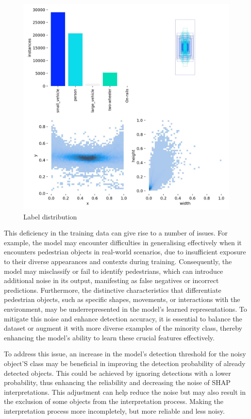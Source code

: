 \begin{figure}[ht]
    \centering
    \includegraphics[width=0.8\linewidth]{figures/labels-30}
    \caption{Label distribution}
    \label{fig:Label_distribution}
\end{figure}

This deficiency in the training data can give rise to a number of issues.
For example, the model may encounter difficulties in generalising effectively when it encounters pedestrian objects in real-world scenarios, due to insufficient exposure to their diverse appearances and contexts during training.
Consequently, the model may misclassify or fail to identify pedestrians, which can introduce additional noise in its output, manifesting as false negatives or incorrect predictions.
Furthermore, the distinctive characteristics that differentiate pedestrian objects, such as specific shapes, movements, or interactions with the environment, may be underrepresented in the model's learned representations.
To mitigate this noise and enhance detection accuracy, it is essential to balance the dataset or augment it with more diverse examples of the minority class, thereby enhancing the model's ability to learn these crucial features effectively.


To address this issue, an increase in the model's detection threshold for the noisy object'S class may be beneficial in improving the detection probability of already detected objects.
This could be achieved by ignoring detections with a lower probability, thus enhancing the reliability and decreasing the noise
of SHAP interpretations.
This adjustment can help reduce the noise but may also result in the exclusion of some objects from the interpretation process.
Making the interpretation process more incompletely, but more reliable and less noisy.

\newpage


